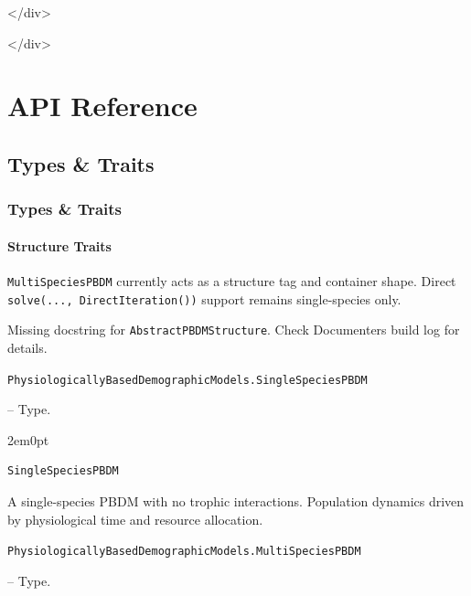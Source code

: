 </div>



</div>



\part{API Reference}


\chapter{Types \& Traits}


\section{Types \& Traits}



\label{6358694584343461021}{}


\subsection{Structure Traits}



\label{14200731482347172889}{}


\texttt{MultiSpeciesPBDM} currently acts as a structure tag and container shape. Direct \texttt{solve(..., DirectIteration())} support remains single-species only.



\begin{tcolorbox}[toptitle=-1mm,bottomtitle=1mm,colback=admonition-warning!50!white,colframe=admonition-warning,title=\textbf{Missing docstring.}]
Missing docstring for \texttt{AbstractPBDMStructure}. Check Documenter{\textquotesingle}s build log for details.

\end{tcolorbox}

\hypertarget{1187432787176553874}{\texttt{PhysiologicallyBasedDemographicModels.SingleSpeciesPBDM}}  -- {Type.}

\begin{adjustwidth}{2em}{0pt}


\begin{verbatim}
SingleSpeciesPBDM
\end{verbatim}

A single-species PBDM with no trophic interactions. Population dynamics driven by physiological time and resource allocation.



\end{adjustwidth}
\hypertarget{3742540922266987035}{\texttt{PhysiologicallyBasedDemographicModels.MultiSpeciesPBDM}}  -- {Type.}

